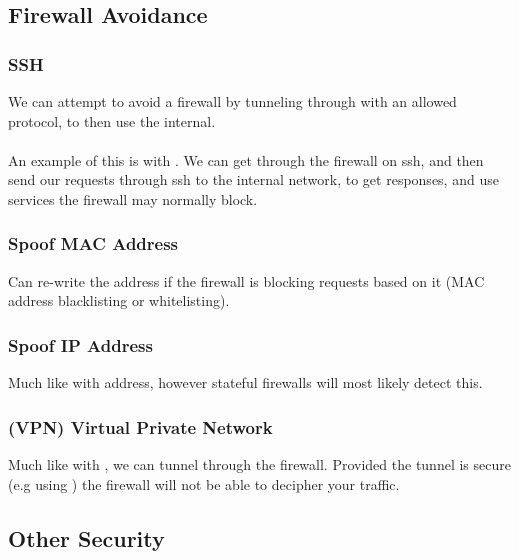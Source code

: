 \documentclass{report}
\begin{document}
        \subsection*{Firewall Avoidance}
            \subsubsection*{SSH}
                We can attempt to avoid a firewall by tunneling through with an allowed protocol, to then use the internal. 
                \\
                \\ An example of this is with . We can get through the firewall on ssh, and then send our requests through ssh to the internal network, to get responses, and use services the firewall may normally block.
            
            \subsubsection*{Spoof MAC Address}
                Can re-write the  address if the firewall is blocking requests based on it (MAC address blacklisting or whitelisting).

            \subsubsection*{Spoof IP Address}
                Much like with  address, however stateful firewalls will most likely detect this.
            
            \subsubsection*{(VPN) Virtual Private Network}
                Much like with , we can tunnel through the firewall. Provided the tunnel is secure (e.g using ) the firewall will not be able to decipher your traffic.

        \subsection*{Other Security}
\end{document}
